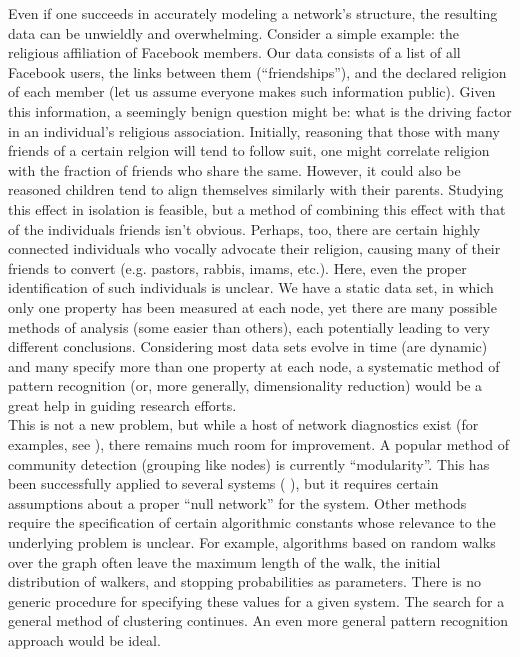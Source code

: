 \documentclass[11pt]{article}
\begin{document}
Even if one succeeds in accurately modeling a network's structure, the resulting data can be unwieldly and overwhelming. Consider a simple example: the religious affiliation of Facebook members. Our data consists of a list of all Facebook users, the links between them (``friendships''), and the declared religion of each member (let us assume everyone makes such information public). Given this information, a seemingly benign question might be: what is the driving factor in an individual's religious association. Initially, reasoning that those with many friends of a certain relgion will tend to follow suit, one might correlate religion with the fraction of friends who share the same. However, it could also be reasoned children tend to align themselves similarly with their parents. Studying this effect in isolation is feasible, but a method of combining this effect with that of the individuals friends isn't obvious. Perhaps, too, there are certain highly connected individuals who vocally advocate their religion, causing many of their friends to convert (e.g. pastors, rabbis, imams, etc.). Here, even the proper identification of such individuals is unclear. We have a static data set, in which only one property has been measured at each node, yet there are many possible methods of analysis (some easier than others), each potentially leading to very different conclusions. Considering most data sets evolve in time (are dynamic) and many specify more than one property at each node, a systematic method of pattern recognition (or, more generally, dimensionality reduction) would be a great help in guiding research efforts. \vspace{1mm}\\
This is not a new problem, but while a host of network diagnostics exist (for examples, see \cite{diffusion distances} \cite{clustering}), there remains much room for improvement. A popular method of community detection (grouping like nodes) is currently ``modularity''. This has been successfully applied to several systems (\cite{basset} \cite{more bassett}), but it requires certain assumptions about a proper ``null network'' for the system. Other methods require the specification of certain algorithmic constants whose relevance to the underlying problem is unclear. For example, algorithms based on random walks over the graph often leave the maximum length of the walk, the initial distribution of walkers, and stopping probabilities as parameters. There is no generic procedure for specifying these values for a given system. The search for a general method of clustering continues. An even more general pattern recognition approach would be ideal.\vspace{1mm}\\
\end{document}
